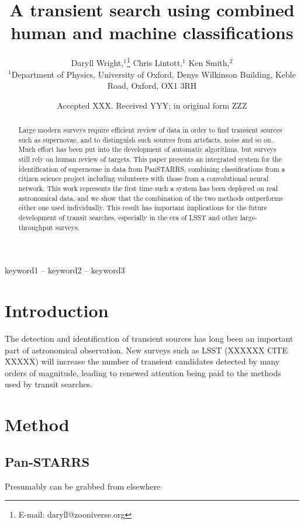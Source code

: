 \documentclass[a4paper,fleqn,usenatbib]{mnras}
\title[Human and machine classifications]{A transient search using combined human and machine classifications}
\author[D. Wright, C. Lintott, K. Smith et al.]{
Daryll Wright,$^{1}$\thanks{E-mail: daryll@zooniverse.org}
Chris Lintott,$^{1}$
Ken Smith,$^{2}$

$^{1}$Department of Physics, University of Oxford, Denys Wilkinson Building, Keble Road, Oxford, OX1 3RH
}
\date{Accepted XXX. Received YYY; in original form ZZZ}
\begin{document}
\label{firstpage}
\pagerange{\pageref{firstpage}--\pageref{lastpage}}
\maketitle

\begin{abstract}
Large modern surveys require efficient review of data in order to find transient sources such as supernovae, and to distinguish such sources from artefacts, noise and so on. Much effort has been put into the development of automatic algorithms, but surveys still rely on human review of targets. This paper presents an integrated system for the identification of supernovae in data from PanSTARRS, combining classifications from a citizen science project including volunteers with those from a convolutional neural network. This work represents the first time such a system has been deployed on real astronomical data, and we show that the combination of the two methods outperforms either one used individually. This result has important implications for the future development of transit searches, especially in the era of LSST and other large-throughput surveys. 
\end{abstract}

\begin{keywords}
keyword1 -- keyword2 -- keyword3
\end{keywords}



\section{Introduction}

The detection and identification of transient sources has long been an important part of astronomical observation. New surveys such as LSST (XXXXXX CITE XXXXX) will increase the number of transient candidates detected by many orders of magnitude, leading to renewed attention being paid to the methods used by transit searches. 

\section{Method}
\subsection{Pan-STARRS}
Presumably can be grabbed from elsewhere
\end{document}
